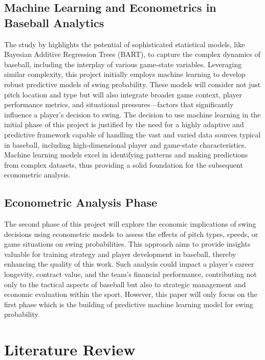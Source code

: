 \documentclass[12pt]{article}
\begin{document}
\subsection{Machine Learning and Econometrics in Baseball Analytics}
The study by \cite{Deshpande2023} highlights the potential of sophisticated statistical models, like Bayesian Additive Regression Trees (BART), to capture the complex dynamics of baseball, including the interplay of various game-state variables. Leveraging similar complexity, this project initially employs machine learning to develop robust predictive models of swing probability. These models will consider not just pitch location and type but will also integrate broader game context, player performance metrics, and situational pressures—factors that significantly influence a player's decision to swing. The decision to use machine learning in the initial phase of this project is justified by the need for a highly adaptive and predictive framework capable of handling the vast and varied data sources typical in baseball, including high-dimensional player and game-state characteristics. Machine learning models excel in identifying patterns and making predictions from complex datasets, thus providing a solid foundation for the subsequent econometric analysis.

\subsection{Econometric Analysis Phase}
The second phase of this project will explore the economic implications of swing decisions using econometric models to assess the effects of pitch types, speeds, or game situations on swing probabilities. This approach aims to provide insights valuable for training strategy and player development in baseball, thereby enhancing the quality of this work. Such analysis could impact a player's career longevity, contract value, and the team's financial performance, contributing not only to the tactical aspects of baseball but also to strategic management and economic evaluation within the sport. However, this paper will only focus on the first phase which is the building of predictive machine learning model for swing probability.


\maketitle

\section{Literature Review}
\end{document}
